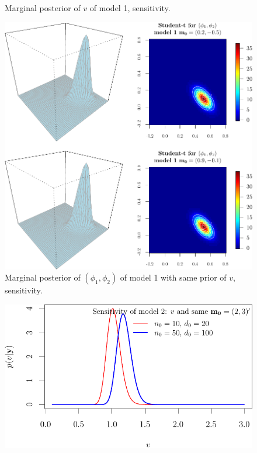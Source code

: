 \documentclass[12pt]{article}\usepackage[]{graphicx}\usepackage[]{color}
\newenvironment{knitrout}{}{} %
\begin{document}
\begin{enumerate}
\begin{enumerate}
\begin{knitrout}
\begin{figure}
{}

\caption[Marginal posterior of $v$ of model 1, sensitivity]{Marginal posterior of $v$ of model 1, sensitivity.}\label{fig:Q4f1senv}
\end{figure}


\end{knitrout}
\begin{knitrout}
\color{fgcolor}\begin{figure}

{\centering \includegraphics[width=.8\linewidth]{figure/hw1_Q4f1senphi-1} 

}

\caption[Marginal posterior of $(\phi_1, \phi_2)$ of model 1 with same prior of $v$, sensitivity]{Marginal posterior of $(\phi_1, \phi_2)$ of model 1 with same prior of $v$, sensitivity.}\label{fig:Q4f1senphi}
\end{figure}


\end{knitrout}
\begin{knitrout}
\color{fgcolor}\begin{figure}

{\centering \includegraphics[width=.7\linewidth]{figure/hw1_Q4f2senv-1} 

}
\end{figure}
\end{knitrout}
\end{enumerate}
\end{enumerate}
\end{document}
